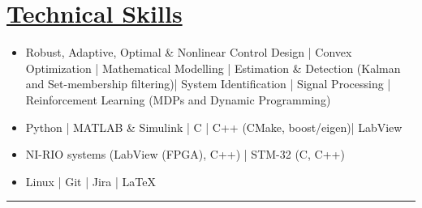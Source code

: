 \section*{\underline{Technical Skills}}
\begin{itemize}
        \item[\itbf{Control and Estimation:}] Robust, Adaptive, Optimal \& Nonlinear Control Design |
        Convex Optimization | Mathematical Modelling |
        Estimation \& Detection (Kalman and Set-membership filtering)|
        System Identification | Signal Processing |
        Reinforcement Learning (MDPs and Dynamic Programming)
        \item[\itbf{Programming:}] Python | MATLAB \& Simulink | C | C++ (CMake, boost/eigen)| LabView
        \item[\itbf{Embedded Systems:}] NI-RIO systems (LabView (FPGA), C++) | STM-32 (C, C++)
        \item[\itbf{OS \& Tools:}] Linux | Git | Jira | \LaTeX
\end{itemize}
\noindent\rule{\textwidth}{0.4pt}
